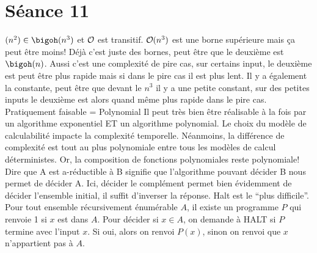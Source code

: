 \section*{Séance 11}

\begin{mcqs}
  {$(n^2) \in \bigoh(n^3)$ et $\bigO$ est transitif.}
  {$\bigO(n^{3})$ est une borne supérieure mais ça peut être moins!}
  {Déjà c'est juste des bornes, peut être que le deuxième est $\bigoh(n)$.
  Aussi c'est une complexité de pire cas, sur certains input, le deuxième est peut être plus rapide mais si dans le pire cas il est plus lent.
  Il y a également la constante, peut être que devant le $n^3$ il y a une petite constant, sur des petites inputs le deuxième est alors quand même plus rapide dans le pire cas.}
  {Pratiquement faisable = Polynomial}
  {Il peut très bien être réalisable à la fois par un algorithme exponentiel ET un algorithme polynomial.}
  {Le choix du modèle de calculabilité impacte la complexité temporelle. Néanmoins, la différence de complexité est tout au plus polynomiale entre tous les modèles de calcul déterministes. Or, la composition de fonctions polynomiales reste polynomiale!}
  {Dire que A est a-réductible à B signifie que l'algorithme pouvant décider B nous permet de décider A. Ici, décider le complément permet bien évidemment de décider l'ensemble initial, il suffit d'inverser la réponse.}
  {Halt est le ``plus difficile''. Pour tout ensemble récursivement énumérable $A$, il existe un programme $P$ qui renvoie 1 si $x$ est dans $A$. Pour décider si $x \in A$, on demande à HALT si $P$ termine avec l'input $x$. Si oui, alors on renvoi $P(x)$, sinon on renvoi que $x$ n'appartient pas à $A$.}

\end{mcqs}
